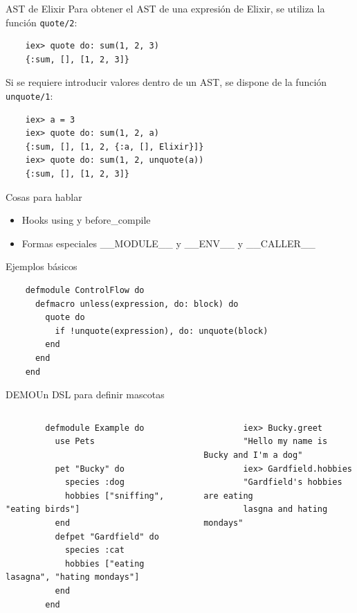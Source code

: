 \documentclass[14pt,aspectratio=169]{beamer}
\begin{document}
\begin{frame}[fragile]{AST de Elixir}
  Para obtener el AST de una expresión de Elixir, se utiliza la función
  \texttt{quote/2}:
  \footnotesize  \begin{verbatim}
    iex> quote do: sum(1, 2, 3)
    {:sum, [], [1, 2, 3]}
  \end{verbatim}
  \normalsize Si se requiere introducir valores dentro de un AST, se dispone de la función
  \texttt{unquote/1}:
  \footnotesize \begin{verbatim}
    iex> a = 3
    iex> quote do: sum(1, 2, a)
    {:sum, [], [1, 2, {:a, [], Elixir}]}
    iex> quote do: sum(1, 2, unquote(a))
    {:sum, [], [1, 2, 3]}
  \end{verbatim}
\end{frame}

\begin{frame}{Cosas para hablar}
  \begin{itemize}
    \item Hooks using y before\_compile
    \item Formas especiales \_\_MODULE\_\_ y \_\_ENV\_\_ y \_\_CALLER\_\_
  \end{itemize}

\end{frame}

\begin{frame}[fragile]{Ejemplos básicos}
  \begin{verbatim}
    defmodule ControlFlow do
      defmacro unless(expression, do: block) do
        quote do
          if !unquote(expression), do: unquote(block)
        end
      end
    end
  \end{verbatim}
\end{frame}

\begin{frame}[fragile]{DEMO}{Un DSL para definir mascotas}
  \begin{columns}
    \begin{column}{0.5\textwidth}
      \scriptsize\begin{verbatim}
        defmodule Example do
          use Pets

          pet "Bucky" do
            species :dog
            hobbies ["sniffing", "eating birds"]
          end
          defpet "Gardfield" do
            species :cat
            hobbies ["eating lasagna", "hating mondays"]
          end
        end
      \end{verbatim}
    \end{column}
    \begin{column}{0.5\textwidth}
      \scriptsize\begin{verbatim}
        iex> Bucky.greet
        "Hello my name is Bucky and I'm a dog"
        iex> Gardfield.hobbies
        "Gardfield's hobbies are eating
        lasgna and hating mondays"
      \end{verbatim}
    \end{column}
  \end{columns}
\end{frame}
\end{document}
